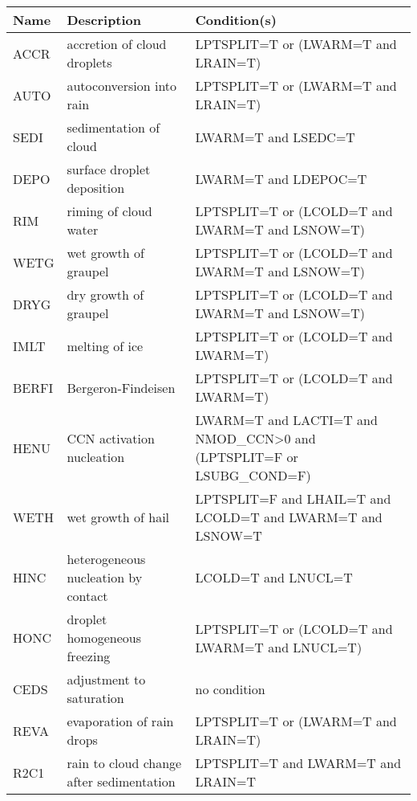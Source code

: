\begin{longtable} {|p{}|p{}|p{}|}
\hline
Name & Description & Condition(s) \\
\hline \hline
\endhead
ACCR   & accretion of cloud droplets                              & LPTSPLIT=T or (LWARM=T and LRAIN=T) \\\hline
AUTO   & autoconversion into rain                                 & LPTSPLIT=T or (LWARM=T and LRAIN=T) \\\hline
SEDI   & sedimentation of cloud                                   & LWARM=T and LSEDC=T \\\hline
DEPO   & surface droplet deposition                               & LWARM=T and LDEPOC=T \\\hline
RIM    & riming of cloud water                                    & LPTSPLIT=T or (LCOLD=T and LWARM=T and LSNOW=T) \\\hline
WETG   & wet growth of graupel                                    & LPTSPLIT=T or (LCOLD=T and LWARM=T and LSNOW=T) \\\hline
DRYG   & dry growth of graupel                                    & LPTSPLIT=T or (LCOLD=T and LWARM=T and LSNOW=T) \\\hline
IMLT   & melting of ice                                           & LPTSPLIT=T or (LCOLD=T and LWARM=T) \\\hline
BERFI  & Bergeron-Findeisen                                       & LPTSPLIT=T or (LCOLD=T and LWARM=T) \\\hline
HENU   & CCN activation nucleation                                & LWARM=T and LACTI=T and NMOD\_CCN>0 and (LPTSPLIT=F or LSUBG\_COND=F) \\\hline
WETH   & wet growth of hail                                       & LPTSPLIT=F and LHAIL=T and LCOLD=T and LWARM=T and LSNOW=T \\\hline
HINC   & heterogeneous nucleation by contact                      & LCOLD=T and LNUCL=T \\\hline
HONC   & droplet homogeneous freezing                             & LPTSPLIT=T or (LCOLD=T and LWARM=T and LNUCL=T) \\\hline
CEDS   & adjustment to saturation                                 & no condition \\\hline
REVA   & evaporation of rain drops                                & LPTSPLIT=T or (LWARM=T and LRAIN=T) \\\hline
R2C1   & rain to cloud change after sedimentation                 & LPTSPLIT=T and LWARM=T and LRAIN=T \\\hline

\end{longtable}

